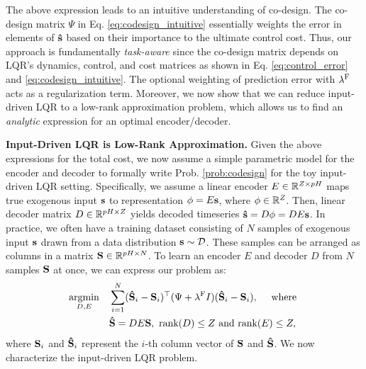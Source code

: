 The above expression leads to an intuitive understanding of co-design. The co-design matrix $\Psi$ in Eq. \ref{eq:codesign_intuitive} essentially weights the error in elements of $\bold{\hat{s}}$ based on their importance to the ultimate control cost. Thus, our approach is fundamentally \textit{task-aware} since the co-design matrix depends on LQR's dynamics, control, and cost matrices as shown in Eq. \ref{eq:control_error} and \ref{eq:codesign_intuitive}. The optional weighting of prediction error with $\lambda^{\mathrm{F}}$ acts as a regularization term. Moreover, we now show that we can reduce input-driven LQR to a low-rank approximation problem, which 
allows us to find an \textit{analytic} expression for an optimal encoder/decoder. 

\textbf{Input-Driven LQR is Low-Rank Approximation.}
Given the above expressions for the total cost, we now assume a simple parametric
model for the encoder and decoder to formally write Prob. \ref{prob:codesign} for the toy input-driven LQR setting. Specifically, we assume a linear encoder $E \in \mathbb{R}^{Z \times pH}$ maps true exogenous input $\bold{s}$ to representation $\phi = E\bold{s}$, where $\phi \in \mathbb{R}^{Z}$. 
Then, linear decoder matrix $D \in \mathbb{R}^{pH \times Z}$ yields decoded timeseries $\bold{\hat{s}} = D\phi = DE\bold{s}$. In practice, we often have a training dataset consisting of $N$ samples of exogenous input $\bold{s}$ drawn from a data distribution $\bold{s} \sim \mathcal{D}$. These samples can be arranged as columns in a matrix $\bold{S} \in \mathbb{R}^{pH \times N}$. To learn an encoder $E$ and decoder $D$ from $N$ samples $\bold{S}$ at once, we can express our problem as:
\begin{align}
    \mathop{\rm argmin}_{D,E} \quad & \sum_{i=1}^{N}(\bold{\hat{S}}_i - \bold{S}_i)^\top (\Psi + \lambda^{\mathrm{F}} I) (\bold{\hat{S}}_i - \bold{S}_i), \quad{\text{~where~}} \notag \\
    & \bold{\hat{S}} = DE \bold{S}, ~\text{rank}(D) \le Z \text{~and~rank}(E) \le Z, 
    \label{eq:low_rank_approximation}
\end{align}
where $\bold{S}_i$ and $\bold{\hat{S}}_i$ represent the $i$-th column vector of $\bold{S}$ and $\bold{\hat{S}}$. We now characterize the input-driven LQR problem.

